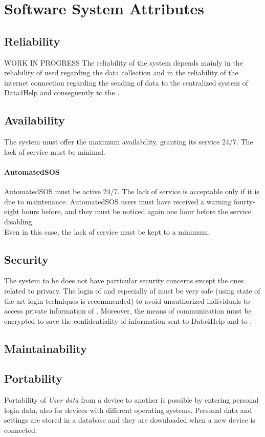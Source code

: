 \documentclass[../../rasd.tex]{subfiles}
\begin{document}
\section{Software System Attributes}
			
			\subsection{Reliability}
			WORK IN PROGRESS
			The reliability of the system depends mainly in the reliability of used  regarding the data collection and in the reliability of the internet connection regarding the sending of data to the centralized system of Data4Help and conseguently to the .
			\subsection{Availability}
			The system must offer the maximum availability, granting its service 24/7. The lack of service must be minimal.
			\paragraph{AutomatedSOS}
			AutomatedSOS must be active 24/7. The lack of service is acceptable only if it is due to maintenance. AutomatedSOS users must have received a warning fourty-eight hours before, and they must be noticed again one hour before the service disabling. \\
			Even in this case, the lack of service must be kept to a minimum.

			\subsection{Security}
			The system to be does not have particular security concerns except the ones related to privacy. The login of  and especially of  must be very safe (using state of the art login techniques is recommended) to avoid unauthorized individuals to access private information of . Moreover, the means of communication must be encrypted to save the confidentiality of information sent to Data4Help and to .
			
			\subsection{Maintainability}
			
			\subsection{Portability}
			Portability of \textit{User data} from a device to another is possible by entering personal login data, also for devices with different operating systems.
			Personal data and settings are stored in a database and they are downloaded when a new device is connected.
\end{document}
